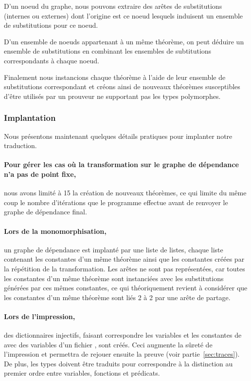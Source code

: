 D'un noeud du graphe, nous pouvons extraire des arêtes de substitutions (internes ou externes) dont l'origine est ce noeud lesquels induisent un ensemble de substitutions pour ce noeud.

D'un ensemble de noeuds appartenant à un même théorème, on peut déduire un ensemble de substitutions en combinant les ensembles de subtitutions correspondants à chaque noeud.

Finalement nous instancions chaque théorème à l'aide de leur ensemble de substitutions correspondant et créons ainsi de nouveaux théorèmes susceptibles d'être utilisés par un prouveur ne supportant pas les types polymorphes.






\subsubsection{Implantation}
\label{sec:traduction:nouveautes:implantation}
Nous présentons maintenant quelques détails pratiques pour implanter notre traduction.

\paragraph{Pour gérer les cas où la transformation sur le graphe de
  dépendance n'a pas de point fixe,} nous avons limité à 15 la création
de nouveaux théorèmes, ce qui limite du même coup le nombre d'itérations
que le programme effectue avant de renvoyer le graphe de dépendance
final.

\paragraph{Lors de la monomorphisation,} un graphe de dépendance est
implanté par une liste de listes, chaque liste contenant les constantes
d'un même théorème ainsi que les constantes créées par la répétition de
la transformation. Les arêtes ne sont pas représentées, car toutes les
constantes d'un même théorème sont instanciées avec les substitutions
générées par ces mêmes constantes, ce qui théoriquement revient à
considérer que les constantes d'un même théorème sont liés 2 à 2 par une
arête de partage.

\paragraph{Lors de l'impression,} des dictionnaires injectifs, faisant
correspondre les variables et les constantes de \holfour avec des
variables d'un fichier \tff, sont créés. Ceci augmente la sûreté de
l'impression et permettra de rejouer ensuite la preuve (voir
partie~\ref{sec:traces}). De plus, les types doivent être traduits pour
correspondre à la distinction au premier ordre entre variables,
fonctions et prédicats.


